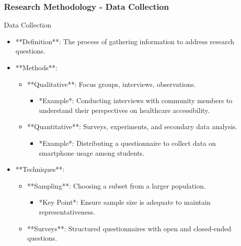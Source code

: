 \documentclass[aspectratio=169]{beamer}
\begin{document}
\begin{frame}[fragile]
    \frametitle{Research Methodology - Data Collection}
    \begin{block}{Data Collection}
        \begin{itemize}
            \item **Definition**: The process of gathering information to address research questions.
            \item **Methods**:
                \begin{itemize}
                    \item **Qualitative**: Focus groups, interviews, observations.
                    \begin{itemize}
                        \item *Example*: Conducting interviews with community members to understand their perspectives on healthcare accessibility.
                    \end{itemize}
                    \item **Quantitative**: Surveys, experiments, and secondary data analysis.
                    \begin{itemize}
                        \item *Example*: Distributing a questionnaire to collect data on smartphone usage among students.
                    \end{itemize}
                \end{itemize}
            \item **Techniques**:
                \begin{itemize}
                    \item **Sampling**: Choosing a subset from a larger population.
                    \begin{itemize}
                        \item *Key Point*: Ensure sample size is adequate to maintain representativeness.
                    \end{itemize}
                    \item **Surveys**: Structured questionnaires with open and closed-ended questions.
                \end{itemize}
        \end{itemize}
    \end{block}
\end{frame}
\end{document}
